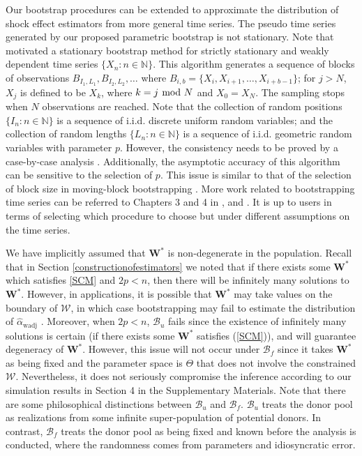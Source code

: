 \documentclass[11pt]{article}
\def\mbf#1{\mathbf{#1}} %
\def\mrm#1{\mathrm{#1}} %
\def\mc#1{\mathcal{#1}} %
\theoremstyle{definition}
\begin{document}
Our bootstrap procedures can be extended to approximate the distribution of shock effect estimators from more general time series. The pseudo time series generated by our proposed parametric bootstrap is not stationary. Note that \citet{politis1994stationary} motivated a stationary bootstrap method for strictly stationary and weakly dependent time series $\{X_n \colon n \in \mathbb{N}\}$. This algorithm generates a sequence of blocks of observations $B_{I_1, L_1}, B_{I_2, L_2}, \ldots$ where $B_{i,b}= \{X_i, X_{i+1}, \ldots, X_{i+b-1}\}$; for $j > N$, $X_{j}$ is defined to be $X_k$, where $k = j \hspace{-.1cm} \mod N$ and $X_0 = X_N$. The sampling stops when $N$ observations are reached. Note that the collection of random positions $\{I_n \colon n \in \mathbb{N}\}$ is a sequence of i.i.d. discrete uniform random variables; and the collection of random lengths $\{L_n \colon n \in \mathbb{N}\}$ is a sequence of  i.i.d. geometric random variables with parameter $p$.  However, the consistency needs to be proved by a case-by-case analysis \citep[Page 66]{politis1999subsampling}. Additionally, the asymptotic accuracy of this algorithm can be sensitive to the selection of $p$. This issue is similar to that of the selection of block size in moving-block bootstrapping \citep{kunsch1989jackknife, liu1992moving}.  More work related to bootstrapping time series  can be referred to Chapters 3 and 4 in \citet{politis1999subsampling}, and \citet{berkowitz2000recent}. It is up to  users in terms of selecting which procedure to choose but under different assumptions on the time series.

We have implicitly assumed that $\mathbf{W}^*$ is non-degenerate in the population.  Recall that in Section \ref{constructionofestimators} we noted that if there exists some $\mathbf{W}^*$ which satisfies \eqref{SCM} and $2p < n$, then there will be infinitely many solutions to $\mathbf{W}^*$. However, in applications, it is possible that $\mathbf{W}^*$ may take values on the boundary of $\mc{W}$, in which case bootstrapping may fail to estimate the distribution of $\hat{\alpha}_{\mrm{wadj}}$ \citep{andrews2000inconsistency}.  Moreover, when $2p < n$, $\mc{B}_u$ fails since the existence of infinitely many solutions is certain (if there exists some $\mathbf{W}^*$ satisfies (\ref{SCM})), and will guarantee degeneracy of  $\mathbf{W}^*$. However, this issue will not occur under $\mc{B}_f$ since it takes $\mbf{W}^*$ as being fixed and the parameter space is $\Theta$ that does not involve the constrained $\mc{W}$. Nevertheless, it does not seriously compromise the inference according to our simulation results in Section 4 in the Supplementary Materials. Note that there are some philosophical distinctions between $\mc{B}_u$  and $\mc{B}_f$. $\mc{B}_u$ treats the donor pool as realizations from some infinite super-population of potential donors. In contrast, $\mc{B}_f$ treats the donor pool as being fixed  and known before the analysis is conducted, where the randomness comes from parameters and idiosyncratic error.
\end{document}
